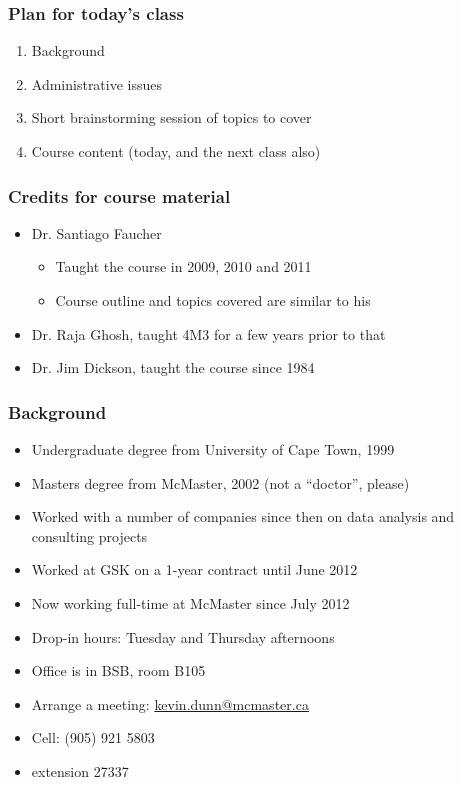 
\begin{frame}\frametitle{Plan for today's class}
	\begin{enumerate}
		\item	Background
		\item	Administrative issues
		\item	Short brainstorming session of topics to cover
		\item	Course content (today, and the next class also)
	\end{enumerate}
\end{frame}

\begin{frame}\frametitle{Credits for course material}
	
	\begin{itemize}
		\item	Dr. Santiago Faucher
		\begin{itemize}
			\item	Taught the course in 2009, 2010 and 2011
			\item	Course outline and topics covered are similar to his
		\end{itemize}
		\item	Dr. Raja Ghosh, taught 4M3 for a few years prior to that
		\item	Dr. Jim Dickson, taught the course since 1984
	\end{itemize}	
\end{frame}

\begin{frame}\frametitle{Background}
	{\color{myGreen}{About myself}}
	\begin{itemize}
		\item	Undergraduate degree from University of Cape Town, 1999
		\item	Masters degree from McMaster, 2002 (not a ``doctor'', please)
		\item	Worked with a number of companies since then on data analysis and consulting projects
		\item	Worked at GSK on a 1-year contract until June 2012		
		\item	Now working full-time at McMaster since July 2012
		\item	Drop-in hours: Tuesday and Thursday afternoons
		\item	Office is in BSB, room B105
		\item	Arrange a meeting: \url{kevin.dunn@mcmaster.ca}
		\item	Cell: (905) 921 5803
		\item	extension 27337
	\end{itemize}	
\end{frame}

